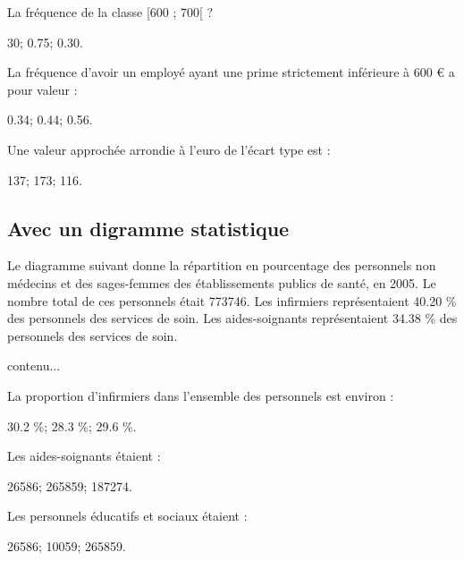 \begin{questions}
	\question La fréquence de la classe [600 ; 700[ ?
	
	\begin{oneparchoices}
		\choice \num{30};
		\choice \num{0.75};
		\CorrectChoice \num{0.30}.
	\end{oneparchoices} 

	\question La fréquence d'avoir un employé ayant une prime strictement inférieure à 600 € a pour valeur :
	
	\begin{oneparchoices}
		\choice \num{0.34};
		\CorrectChoice \num{0.44};
		\choice \num{0.56}.
	\end{oneparchoices} 

	\question Une valeur approchée arrondie à l'euro de l'écart type est :
	
	\begin{oneparchoices}
		\choice \num{137};
		\choice \num{173};
		\CorrectChoice \num{116}.
	\end{oneparchoices} 
\end{questions}  

\subsection{Avec un digramme statistique}

Le diagramme suivant donne la répartition en pourcentage des personnels non médecins et des sages-femmes des établissements publics de santé, en 2005.
Le nombre total de ces personnels était \num{773746}.
Les infirmiers représentaient \num{40.20} \% des personnels des services de soin. Les aides-soignants représentaient \num{34.38} \% des personnels des services de soin.


\begin{center}
	contenu...
\end{center}
\begin{questions}
	\question La proportion d'infirmiers dans l'ensemble des personnels est environ :
	
	\begin{oneparchoices}
		\choice \num{30.2} \%;
		\CorrectChoice \num{28.3} \%;
		\choice \num{29.6} \%.
		
	\end{oneparchoices} 

	\question Les aides-soignants étaient :
	
	\begin{oneparchoices}
		\choice \num{26586};
		\choice \num{265859};
		\CorrectChoice \num{187274}.
		
	\end{oneparchoices} 

	\question Les personnels éducatifs et sociaux étaient :
	
	\begin{oneparchoices}
		\choice \num{26586};
		\CorrectChoice \num{10059};
		\choice \num{265859}.
		
	\end{oneparchoices} 
\end{questions}